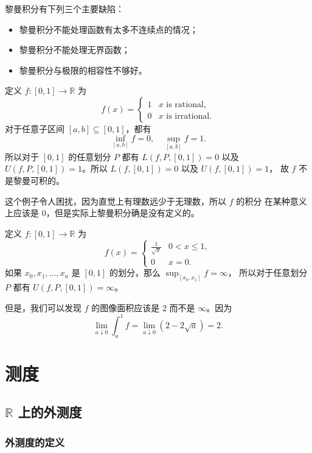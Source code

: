 \documentclass[fontset=none]{Notes}
\begin{document}
黎曼积分有下列三个主要缺陷：
\begin{itemize}
  \item 黎曼积分不能处理函数有太多不连续点的情况；
  \item 黎曼积分不能处理无界函数；
  \item 黎曼积分与极限的相容性不够好。
\end{itemize}

\begin{example}[一个不黎曼可积的函数]
  定义 $f:[0,1]\to \mathbb{R}$ 为
  \[
    f(x)=\begin{cases}
      1 & \text{$x$ is rational},\\
      0 & \text{$x$ is irrational}.
    \end{cases}
  \]
  对于任意子区间 $[a,b]\subseteq [0,1]$，都有
  \[
    \inf_{[a,b]}f=0,\quad \sup_{[a,b]}f=1.
  \]
  所以对于 $[0,1]$ 的任意划分 $P$ 都有 $L(f,P,[0,1])=0$ 以及
  $U(f,P,[0,1])=1$。所以 $L(f,[0,1])=0$ 以及 $U(f,[0,1])=1$，
  故 $f$ 不是黎曼可积的。

  这个例子令人困扰，因为直觉上有理数远少于无理数，所以 $f$ 的积分
  在某种意义上应该是 0，但是实际上黎曼积分确是没有定义的。
\end{example}

\begin{example}[黎曼积分不能处理无界函数]
  定义 $f:[0,1]\to \mathbb{R}$ 为
  \[
    f(x)=\begin{cases}
      \frac{1}{\sqrt{x}} & 0<x\leq 1,\\
      0 & x=0.
    \end{cases}
  \]
  如果 $x_0,x_1,\dots,x_n$ 是 $[0,1]$ 的划分，那么 $\sup_{[x_0,x_1]}f=\infty$，
  所以对于任意划分 $P$ 都有 $U(f,P,[0,1])=\infty$。

  但是，我们可以发现 $f$ 的图像面积应该是 $2$ 而不是 $\infty$。因为
  \[
    \lim_{a\downarrow  0}\int_a^1 f=\lim_{a\downarrow 0}(2-2\sqrt{a})=2.
  \]
  
\end{example}


\chapter{测度}

\section{$\mathbb{R}$ 上的外测度}

\subsection{外测度的定义}
\end{document}
